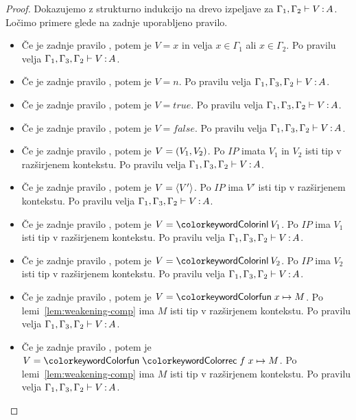 \begin{proof}
	Dokazujemo z strukturno indukcijo na drevo izpeljave za $\Gamma_1, \Gamma_2 \vdash V \mathinner{:} A$.
	Ločimo primere glede na zadnje uporabljeno pravilo.
	
	\begin{itemize}
		\item Če je zadnje pravilo , potem je $V = x$ in velja $x \in \Gamma_1$ ali $x \in \Gamma_2$. Po pravilu  velja $\Gamma_1, \Gamma_3, \Gamma_2 \vdash V \mathinner{:} A$.
		
		\item Če je zadnje pravilo , potem je $V = n$. Po pravilu  velja $\Gamma_1, \Gamma_3, \Gamma_2 \vdash V \mathinner{:} A$.
		\item Če je zadnje pravilo , potem je $V = true$. Po pravilu  velja $\Gamma_1, \Gamma_3, \Gamma_2 \vdash V \mathinner{:} A$.
		\item Če je zadnje pravilo , potem je $V = false$. Po pravilu  velja $\Gamma_1, \Gamma_3, \Gamma_2 \vdash V \mathinner{:} A$.
		
		\item Če je zadnje pravilo , potem je $V =( V_1 , V_2 )$. Po $IP$ imata $V_1$ in $V_2$ isti tip v razširjenem kontekstu.
		Po pravilu  velja $\Gamma_1, \Gamma_3, \Gamma_2 \vdash V \mathinner{:} A$.
		
		\item Če je zadnje pravilo , potem je $V = \langle V' \rangle$. Po $IP$ ima $V'$ isti tip v razširjenem kontekstu.
		Po pravilu  velja $\Gamma_1, \Gamma_3, \Gamma_2 \vdash V \mathinner{:} A$.
		
		\item Če je zadnje pravilo , potem je $V = \tminl{V_1}$. Po $IP$ ima $V_1$ isti tip v razširjenem kontekstu.
		Po pravilu  velja $\Gamma_1, \Gamma_3, \Gamma_2 \vdash V \mathinner{:} A$.
		
		\item Če je zadnje pravilo , potem je $V = \tminl{V_2}$. Po $IP$ ima $V_2$ isti tip v razširjenem kontekstu.
		Po pravilu  velja $\Gamma_1, \Gamma_3, \Gamma_2 \vdash V \mathinner{:} A$.
		
		\item Če je zadnje pravilo , potem je $V = \tmfunano{x}{M}$. Po lemi~\ref{lem:weakening-comp} ima $M$ isti tip v razširjenem kontekstu.
		Po pravilu  velja $\Gamma_1, \Gamma_3, \Gamma_2 \vdash V \mathinner{:} A$.
		
		\item Če je zadnje pravilo , potem je $V = \tmfunrecano{f}{x}{M}$. Po lemi~\ref{lem:weakening-comp} ima $M$ isti tip v razširjenem kontekstu.
		Po pravilu  velja $\Gamma_1, \Gamma_3, \Gamma_2 \vdash V \mathinner{:} A$.
	\end{itemize}
\end{proof}

